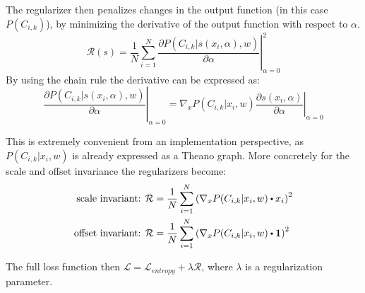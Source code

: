 The regularizer then penalizes changes in the output function (in this case $P(C_{i, k})$), by minimizing the derivative of the output function with respect to $\alpha$.
\begin{equation}
\mathcal{R}(s) = \frac{1}{N} \sum_{i=1}^N \left. \frac{\partial P(C_{i, k} | s(x_i, \alpha), w)}{\partial \alpha} \right|^2_{\alpha=0}
\end{equation}
By using the chain rule the derivative can be expressed as:
\begin{equation*}
\left. \frac{\partial P(C_{i, k} | s(x_i, \alpha), w)}{\partial \alpha} \right|_{\alpha=0} = \left.\nabla_x P(C_{i, k} |  x_i, w) \frac{\partial s(x_i, \alpha)}{\partial \alpha} \right|_{\alpha=0}
\end{equation*}

This is extremely convenient from an implementation perspective, as $P(C_{i, k} | x_i, w)$ is already expressed as a Theano graph. More concretely for the scale and offset invariance the regularizers become:
\begin{align}
\text{scale invariant: }& \mathcal{R} = \frac{1}{N} \sum_{i=1}^N \left(\nabla_x P(C_{i, k} | x_i, w) \bigcdot x_i\right)^2 \\
\text{offset invariant: }& \mathcal{R} = \frac{1}{N} \sum_{i=1}^N \left(\nabla_x P(C_{i, k} | x_i, w) \bigcdot \mathbf{1}\right)^2
\end{align}

The full loss function then $\mathcal{L} = \mathcal{L}_{entropy} + \lambda \mathcal{R}$, where $\lambda$ is a regularization parameter.
